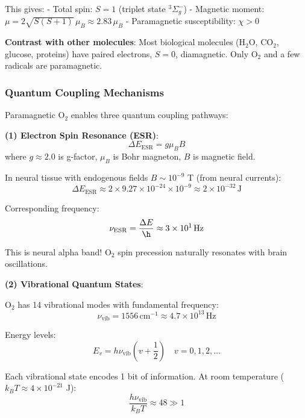 \documentclass[11pt,onecolumn]{article}
\begin{document}
This gives:
- Total spin: $S = 1$ (triplet state $^3\Sigma_g^-$)
- Magnetic moment: $\mu = 2\sqrt{S(S+1)}\,\mu_B \approx 2.83\,\mu_B$
- Paramagnetic susceptibility: $\chi > 0$

\textbf{Contrast with other molecules}: Most biological molecules (H$_2$O, CO$_2$, glucose, proteins) have paired electrons, $S=0$, diamagnetic. Only O$_2$ and a few radicals are paramagnetic.

\subsubsection{Quantum Coupling Mechanisms}

Paramagnetic O$_2$ enables three quantum coupling pathways:

\textbf{(1) Electron Spin Resonance (ESR)}:
\begin{equation}
\Delta E_{\text{ESR}} = g \mu_B B
\end{equation}
where $g \approx 2.0$ is g-factor, $\mu_B$ is Bohr magneton, $B$ is magnetic field.

In neural tissue with endogenous fields $B \sim 10^{-9}$ T (from neural currents):
\begin{equation}
\Delta E_{\text{ESR}} \approx 2 \times 9.27 \times 10^{-24} \times 10^{-9} \approx 2 \times 10^{-32}\,\text{J}
\end{equation}

Corresponding frequency:
\begin{equation}
\nu_{\text{ESR}} = \frac{\Delta E}{\h} \approx 3 \times 10^{1}\,\text{Hz}
\end{equation}

This is neural alpha band! O$_2$ spin precession naturally resonates with brain oscillations.

\textbf{(2) Vibrational Quantum States}:

O$_2$ has 14 vibrational modes with fundamental frequency:
\begin{equation}
\nu_{\text{vib}} = 1556\,\text{cm}^{-1} \approx 4.7 \times 10^{13}\,\text{Hz}
\end{equation}

Energy levels:
\begin{equation}
E_v = h\nu_{\text{vib}}\left(v + \frac{1}{2}\right) \quad v = 0,1,2,\ldots
\end{equation}

Each vibrational state encodes 1 bit of information. At room temperature ($k_B T \approx 4 \times 10^{-21}$ J):
\begin{equation}
\frac{h\nu_{\text{vib}}}{k_B T} \approx 48 \gg 1
\end{equation}
\end{document}
